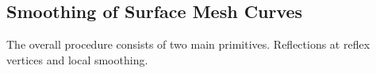 \documentclass{stdlocal}
\begin{document}

\subsection{Smoothing of Surface Mesh Curves} %
\label{sub:smoothing_of_surface_mesh_curves}
  The overall procedure consists of two main primitives.
  Reflections at reflex vertices and local smoothing.


\end{document}
